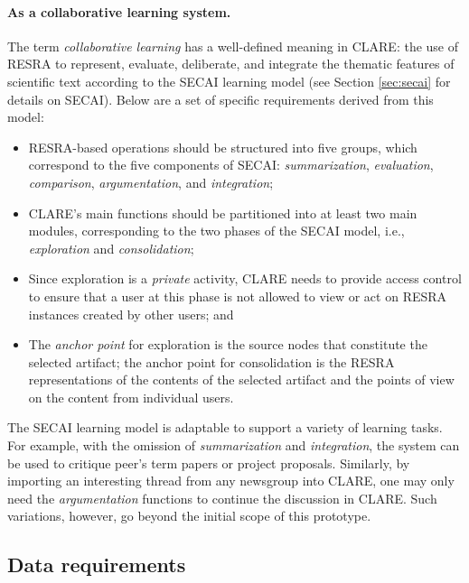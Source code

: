 \paragraph{As a collaborative learning system.}

The term {\it collaborative learning \/} has a well-defined meaning in
CLARE: the use of RESRA to represent, evaluate, deliberate, and integrate
the thematic features of scientific text according to the SECAI learning
model (see Section \ref{sec:secai} for details on SECAI). Below are a set
of specific requirements derived from this model:

\begin{itemize}
\item RESRA-based operations should be structured into five groups, which
  correspond to the five components of SECAI: {\it summarization\/}, {\it
  evaluation\/}, {\it comparison\/}, {\it argumentation\/}, and {\it
  integration\/};
  
\item CLARE's main functions should be partitioned into at least two main
  modules, corresponding to the two phases of the SECAI model, i.e., {\it
  exploration\/} and {\it consolidation\/};
  
\item Since exploration is a {\it private} activity, CLARE needs to provide
  access control to ensure that a user at this phase is not allowed to view
  or act on RESRA instances created by other users; and
  
\item The {\it anchor point} for exploration is the source nodes that
  constitute the selected artifact; the anchor point for consolidation is
  the RESRA representations of the contents of the selected artifact and
  the points of view on the content from individual users.
\end{itemize}

The SECAI learning model is adaptable to support a variety of learning
tasks. For example, with the omission of {\it summarization\/} and {\it
integration\/}, the system can be used to critique peer's term papers or
project proposals. Similarly, by importing an interesting thread from any
newsgroup into CLARE, one may only need the {\it argumentation\/} functions
to continue the discussion in CLARE. Such variations, however, go beyond
the initial scope of this prototype.


\subsection{Data requirements}
\label{sec:data requirements}

